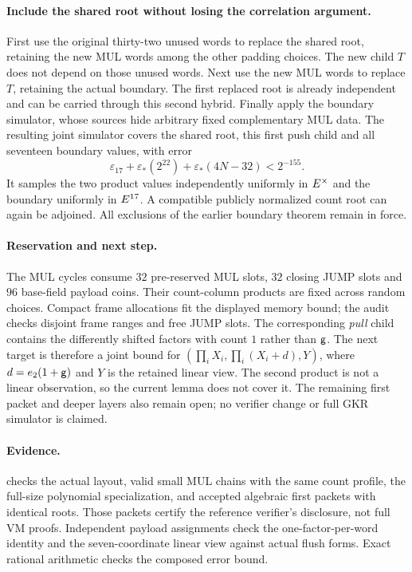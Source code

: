 \documentclass[11pt]{article}
\begin{document}
\paragraph{Include the shared root without losing the correlation argument.} First use the original thirty-two unused words to replace the shared root, retaining the new MUL words among the other padding choices. The new child $T$ does not depend on those unused words. Next use the new MUL words to replace $T$, retaining the actual boundary. The first replaced root is already independent and can be carried through this second hybrid. Finally apply the boundary simulator, whose sources hide arbitrary fixed complementary MUL data. The resulting joint simulator covers the shared root, this first push child and all seventeen boundary values, with error
\[
 \varepsilon_{17}+\varepsilon_*(2^{22})+
 \varepsilon_*(4N-32)<2^{-155}.
\]
It samples the two product values independently uniformly in $E^\times$ and the boundary uniformly in $E^{17}$. A compatible publicly normalized count root can again be adjoined. All exclusions of the earlier boundary theorem remain in force.

\paragraph{Reservation and next step.} The MUL cycles consume $32$ pre-reserved MUL slots, $32$ closing JUMP slots and $96$ base-field payload coins. Their count-column products are fixed across random choices. Compact frame allocations fit the displayed memory bound; the audit checks disjoint frame ranges and free JUMP slots. The corresponding \emph{pull} child contains the differently shifted factors with count $1$ rather than $\mathsf{g}$. The next target is therefore a joint bound for $(\prod_iX_i,\prod_i(X_i+d),Y)$, where $d=e_2(1+\mathsf{g})$ and $Y$ is the retained linear view. The second product is not a linear observation, so the current lemma does not cover it. The remaining first packet and deeper layers also remain open; no verifier change or full GKR simulator is claimed.

\paragraph{Evidence.}  checks the actual layout, valid small MUL chains with the same count profile, the full-size polynomial specialization, and accepted algebraic first packets with identical roots. Those packets certify the reference verifier's disclosure, not full VM proofs. Independent payload assignments check the one-factor-per-word identity and the seven-coordinate linear view against actual flush forms. Exact rational arithmetic checks the composed error bound.
\end{document}
